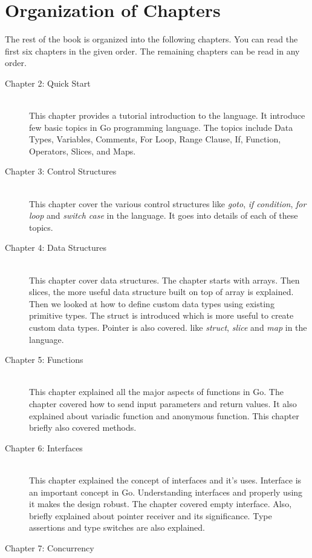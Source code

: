 \section{Organization of Chapters}

The rest of the book is organized into the following chapters. You can read the
first six chapters in the given order. The remaining chapters can be read in any
order.

\begin{description}
\item[Chapter 2: Quick Start] \hfill \\
This chapter provides a tutorial introduction to the language. It introduce few
basic topics in Go programming language. The topics include Data Types,
Variables, Comments, For Loop, Range Clause, If, Function, Operators, Slices,
and Maps.
\item[Chapter 3: Control Structures] \hfill \\
This chapter cover the various control structures like \textit{goto}, \textit{if
condition}, \textit{for loop} and \textit{switch case} in the language. It goes
into details of each of these topics.
\item[Chapter 4: Data Structures] \hfill \\
This chapter cover data structures. The chapter starts with arrays. Then slices,
the more useful data structure built on top of array is explained. Then we
looked at how to define custom data types using existing primitive types. The
struct is introduced which is more useful to create custom data types. Pointer
is also covered. like \textit{struct}, \textit{slice} and \textit{map} in the
language.
\item[Chapter 5: Functions] \hfill \\
This chapter explained all the major aspects of functions in Go. The chapter
covered how to send input parameters and return values. It also explained about
variadic function and anonymous function. This chapter briefly also covered
methods.
\item[Chapter 6: Interfaces] \hfill \\
This chapter explained the concept of interfaces and it's uses. Interface is an
important concept in Go. Understanding interfaces and properly using it makes
the design robust. The chapter covered empty interface. Also, briefly explained
about pointer receiver and its significance. Type assertions and type switches
are also explained.
\item[Chapter 7: Concurrency] \hfill \\

\end{description}
